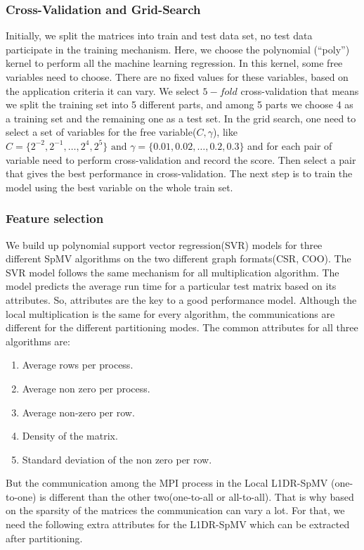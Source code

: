 \documentclass[conference, 10ppt]{IEEEtran}
\begin{document}
\subsubsection{Cross-Validation and Grid-Search}
Initially, we split the matrices into train and test data set, no test
data participate in the training mechanism. Here, we choose the
polynomial (``poly'') kernel to perform all the machine learning
regression. In this kernel, some free variables need to choose. 
There are no fixed values for these variables, based on the
application criteria it can vary. We select $5-fold$ cross-validation
that means we split the training set into 5 different parts, and among
5 parts we choose 4 as a training set and the remaining one as a test
set. In the grid search, one need to select a set of variables for the
free variable($C,\gamma$), like $C=\{2^{-2},
2^{-1}, \dots, 2^4, 2^5\}\text{ and }\gamma=\{0.01, 0.02, \dots, 0.2, 0.3\}$
and for each pair of variable need to perform cross-validation and
record the score. Then select a pair that gives the best performance
in cross-validation.  The next step is to train the model using the best
variable on the whole train set.

\subsubsection{Feature selection}
We build up polynomial support vector regression(SVR) models for three
different SpMV algorithms on the two different graph formats(CSR,
COO).  The SVR model follows the same mechanism for all multiplication
algorithm. The model predicts the average run time for a particular
test matrix based on its attributes. So, attributes are the key to a
good performance model.  Although the local multiplication is the same
for every algorithm, the communications are different for the
different partitioning modes. The common attributes for all three
algorithms are:

\begin{enumerate}
\label{list:static-attributes}
\item Average rows per process.
\item Average non zero per process.
\item Average non-zero per row.
\item Density of the matrix.
\item Standard deviation of the non zero per row.
\end{enumerate}

But the communication among the MPI process in the Local L1DR-SpMV
(one-to-one) is different than the other two(one-to-all or all-to-all).
That is why based on the sparsity of the matrices the communication
can vary a lot. For that, we need the following extra attributes for
the L1DR-SpMV which can be extracted after partitioning.
\end{document}
